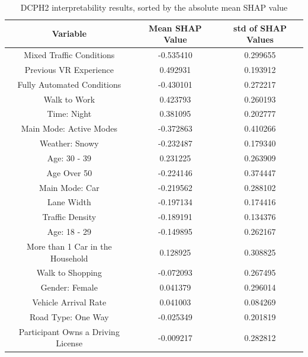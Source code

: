\begin{table}
\caption{DCPH2 interpretability results, sorted by the absolute mean SHAP value}
\footnotesize
    \centering
    \begin{tabular}{|ccc|}
    \hline
    \textbf{Variable} &   \textbf{Mean SHAP Value} &  \textbf{std of SHAP Values} \\
    \hline
    Mixed Traffic Conditions & -0.535410 &  0.299655 \\
    \hline
    Previous VR Experience & 0.492931 &  0.193912\\
    \hline
    Fully Automated Conditions&-0.430101 &  0.272217\\
    \hline
    Walk to Work& 0.423793 &  0.260193 \\
    \hline
    Time: Night& 0.381095 &  0.202777 \\
    \hline
    Main Mode: Active Modes	&-0.372863 &  0.410266 \\
    \hline 
    Weather: Snowy&-0.232487 &  0.179340 \\
    \hline
    Age: 30 - 39	& 0.231225 &  0.263909 \\
    \hline
    Age Over 50&-0.224146 &  0.374447 \\
    \hline
    Main Mode: Car&-0.219562 &  0.288102 \\
    \hline
    Lane Width&-0.197134 &  0.174416 \\
    \hline
    Traffic Density&-0.189191 &  0.134376 \\
    \hline
    Age: 18 - 29	&-0.149895 &  0.262167 \\
    \hline
    More than 1 Car in the Household& 0.128925 &  0.308825 \\
    \hline
    Walk to Shopping&-0.072093 &  0.267495 \\
    \hline
    Gender: Female& 0.041379 &  0.296014 \\
    \hline
    Vehicle Arrival Rate& 0.041003 &  0.084269 \\
    \hline
    Road Type: One Way&-0.025349 &  0.201819 \\
    \hline
    Participant Owns a Driving License	&-0.009217 &  0.282812 \\
    \hline
    \end{tabular}
    \label{tab:sh}
\end{table}


